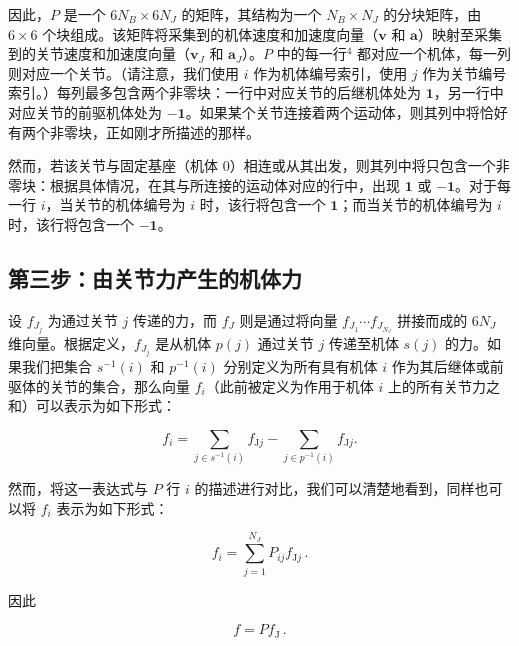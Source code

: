 \documentclass[10pt,a4paper]{book}
\theoremstyle{thmstyle} %
\theoremstyle{defstyle} %
\theoremstyle{prostyle} %
\begin{document}
因此，$P$ 是一个 $6N_{B} \times 6N_{J}$ 的矩阵，其结构为一个 $N_{B} \times N_{J}$ 的分块矩阵，由 $6 \times 6$ 个块组成。该矩阵将采集到的机体速度和加速度向量（$\boldsymbol{v}$ 和 $\boldsymbol{a}$）映射至采集到的关节速度和加速度向量（$\boldsymbol{v}_{J}$ 和 $\boldsymbol{a}_{J}$）。$P$ 中的每一行$^{4}$ 都对应一个机体，每一列则对应一个关节。（请注意，我们使用 $i$ 作为机体编号索引，使用 $j$ 作为关节编号索引。）每列最多包含两个非零块：一行中对应关节的后继机体处为 $\mathbf{1}$，另一行中对应关节的前驱机体处为 $-\mathbf{1}$。如果某个关节连接着两个运动体，则其列中将恰好有两个非零块，正如刚才所描述的那样。



然而，若该关节与固定基座（机体 0）相连或从其出发，则其列中将只包含一个非零块：根据具体情况，在其与所连接的运动体对应的行中，出现 $\mathbf{1}$ 或 $-\mathbf{1}$。对于每一行 $i$，当关节的机体编号为 $i$ 时，该行将包含一个 $\mathbf{1}$；而当关节的机体编号为 $i$ 时，该行将包含一个 $-\mathbf{1}$。



\subsection{第三步：由关节力产生的机体力}





设 $f_{J_{j}}$ 为通过关节 $j$ 传递的力，而 $f_{J}$ 则是通过将向量 $f_{J_{1}}\cdots f_{J_{N_{J}}}$ 拼接而成的 $6N_{J}$ 维向量。根据定义，$f_{J_{j}}$ 是从机体 $p(j)$ 通过关节 $j$ 传递至机体 $s(j)$ 的力。如果我们把集合 $s^{-1}(i)$ 和 $p^{-1}(i)$ 分别定义为所有具有机体 $i$ 作为其后继体或前驱体的关节的集合，那么向量 $f_{i}$（此前被定义为作用于机体 $i$ 上的所有关节力之和）可以表示为如下形式：



$$
f _ { i } = \sum _ { j \in s ^{- 1} ( i ) } f _ { \mathrm { J } j } - \sum _ { j \in p ^{- 1} ( i ) } f _ { \mathrm { J } j } .
$$



然而，将这一表达式与 $P$ 行 $i$ 的描述进行对比，我们可以清楚地看到，同样也可以将 $f_i$ 表示为如下形式：



$$
f _ { i } = \sum _ { j = 1 } ^{N _ { J} } P _ { i j } f _ { \mathrm { J } j } \, .
$$



因此



$$
f = P f _ { \mathrm { J } } \, .
$$
\end{document}
